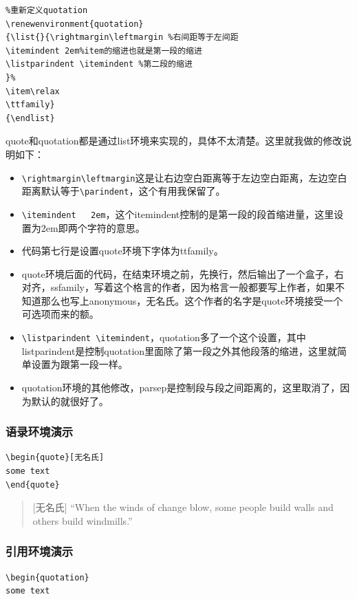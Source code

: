 \documentclass[12pt,oneside]{book}
\begin{document}
\begin{common-format}
\begin{Verbatim}
%重新定义quotation
\renewenvironment{quotation}
{\list{}{\rightmargin\leftmargin %右间距等于左间距
\itemindent 2em%item的缩进也就是第一段的缩进
\listparindent \itemindent %第二段的缩进
}%
\item\relax
\ttfamily}
{\endlist}
\end{Verbatim}
quote和quotation都是通过list环境来实现的，具体不太清楚。这里就我做的修改说明如下：
\begin{itemize}
\item \verb+\rightmargin\leftmargin+这是让右边空白距离等于左边空白距离，左边空白距离默认等于\verb+\parindent+，这个有用我保留了。
\item \verb+\itemindent   2em+，这个itemindent控制的是第一段的段首缩进量，这里设置为2em即两个字符的意思。
\item 代码第七行是设置quote环境下字体为ttfamily。
\item quote环境后面的代码，在结束环境之前，先换行，然后输出了一个盒子，右对齐，ssfamily，写着这个格言的作者，因为格言一般都要写上作者，如果不知道那么也写上anonymous，无名氏。这个作者的名字是quote环境接受一个可选项而来的额。
\item \verb+\listparindent \itemindent+，quotation多了一个这个设置，其中listparindent是控制quotation里面除了第一段之外其他段落的缩进，这里就简单设置为跟第一段一样。
\item quotation环境的其他修改，parsep是控制段与段之间距离的，这里取消了，因为默认的就很好了。
\end{itemize}

\subsubsection{语录环境演示}
\begin{Verbatim}
\begin{quote}[无名氏]
some text
\end{quote}
\end{Verbatim}


\begin{quote}[无名氏]
“When the winds of change blow, some people build walls and others build windmills.”
\end{quote}

\subsubsection{引用环境演示}
\begin{Verbatim}
\begin{quotation}
some text


\end{Verbatim}
\end{common-format}
\end{document}
